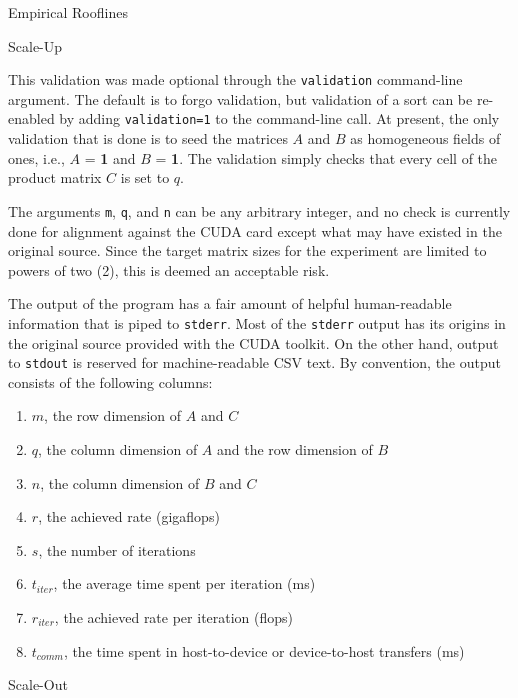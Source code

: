 \documentclass{article}
\begin{document}
\begin{section}{Empirical Rooflines}
\begin{subsection}{Scale-Up}
\begin{paragraph}{}
      This validation was made optional through the \texttt{validation} command-line argument. The default is to forgo validation, but validation of a sort
      can be re-enabled by adding \texttt{validation=1} to the command-line call. At present, the only validation that is done is to seed the matrices $A$
      and $B$ as homogeneous fields of ones, i.e., $A$ = \textbf{1} and $B$ = \textbf{1}. The validation simply checks that every cell of the product matrix
      $C$ is set to $q$.
    \end{paragraph}
    \begin{paragraph}{}
      The arguments \texttt{m}, \texttt{q}, and \texttt{n} can be any arbitrary integer, and no check is currently done for alignment against the CUDA card
      except what may have existed in the original source. Since the target matrix sizes for the experiment are limited to powers of two (2), this is deemed
      an acceptable risk.
    \end{paragraph}
    \begin{paragraph}{}
      The output of the program has a fair amount of helpful human-readable information that is piped to \texttt{stderr}. Most of the \texttt{stderr} output
      has its origins in the original source provided with the CUDA toolkit. On the other hand, output to \texttt{stdout} is reserved for machine-readable CSV text.
      By convention, the output consists of the following columns:
      \begin{enumerate}
      \item{$m$, the row dimension of $A$ and $C$}
      \item{$q$, the column dimension of $A$ and the row dimension of $B$}
      \item{$n$, the column dimension of $B$ and $C$}
      \item{$r$, the achieved rate (gigaflops)}
      \item{$s$, the number of iterations}
      \item{$t_{iter}$, the average time spent per iteration (ms)}
      \item{$r_{iter}$, the achieved rate per iteration (flops)}
      \item{$t_{comm}$, the time spent in host-to-device or device-to-host transfers (ms)}
      \end{enumerate}
    \end{paragraph}
  \end{subsection}
  \begin{subsection}{Scale-Out}

\end{subsection}
\end{section}
\end{document}
